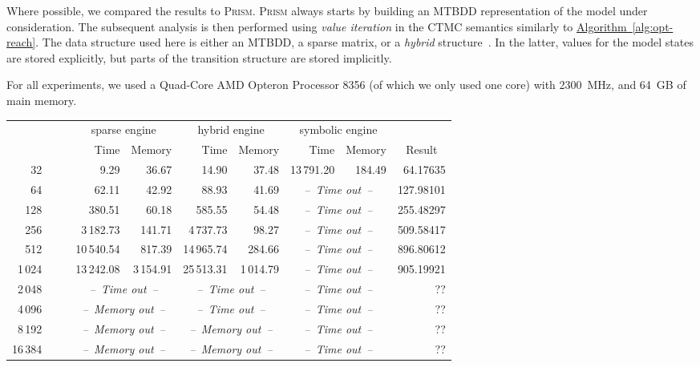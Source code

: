 \documentclass[10pt,twocolumn]{article}
\newcommand{\PRISM}{\textsc{Prism}\xspace}
\newcommand{\timelimit}{\emph{--~Time out~--}}
\newcommand{\memlimit}{\emph{--~Memory out~--}}
\newcommand{\refalg}[1]{\texorpdfstring{\hyperref[alg:#1]{Algorithm~\ref*{alg:#1}}}{Algorithm~\ref*{alg:#1}}}
\begin{document}
Where possible, we compared the results to \PRISM.
\PRISM always starts by building an MTBDD representation of the model under consideration.
The subsequent analysis is then performed using \emph{value iteration} in the CTMC semantics similarly to \refalg{opt-reach}.
The data structure used here is either an MTBDD, a sparse matrix, or a \emph{hybrid} structure~\cite{KwiatkowskaNP04}.
In the latter, values for the model states are stored explicitly, but parts of the transition structure are stored implicitly.

For all experiments, we used a Quad-Core AMD Opteron\texttrademark{} Processor 8356 (of which we only used one core)
with 2300~MHz, and 64~GB of main memory.

  \setlength{\tabcolsep}{0.6mm}
\begin{table*}
  \centering
  \caption{\PRISM results for the number of repairs in the workstation cluster until }
  \label{tab:cluster_detailed_prism}
\begin{tabular}{|rrr|rr|rr|rr|r|}
  \hline
    && & \multicolumn{2}{c|}{sparse engine} & \multicolumn{2}{c|}{hybrid engine} & \multicolumn{2}{c|}{symbolic engine} & \\
   & \multicolumn{1}{c}{} & \multicolumn{1}{c|}{} & Time & Memory & Time & Memory & Time & Memory & \multicolumn{1}{c|}{Result} \\
  \hline
  32 &  &  & 9.29 & 36.67 & 14.90 & 37.48 & 13\,791.20 & 184.49 & 64.17635 \\
  64 &  &  & 62.11 & 42.92 & 88.93 & 41.69 & \multicolumn{2}{c|}{\timelimit} & 127.98101 \\
  128 &  &  & 380.51 & 60.18 & 585.55 & 54.48 & \multicolumn{2}{c|}{\timelimit} & 255.48297 \\
  256 &  &  & 3\,182.73 & 141.71 & 4\,737.73 & 98.27 & \multicolumn{2}{c|}{\timelimit} & 509.58417 \\
  512 &  &  & 10\,540.54 & 817.39 & 14\,965.74 & 284.66 & \multicolumn{2}{c|}{\timelimit} & 896.80612 \\
  1\,024 &  &  & 13\,242.08 & 3\,154.91 & 25\,513.31 & 1\,014.79 & \multicolumn{2}{c|}{\timelimit} & 905.19921 \\
  2\,048 &  &  & \multicolumn{2}{c|}{\timelimit} & \multicolumn{2}{c|}{\timelimit} & \multicolumn{2}{c|}{\timelimit} & ?? \\
  4\,096 &  &  & \multicolumn{2}{c|}{\memlimit} & \multicolumn{2}{c|}{\timelimit} & \multicolumn{2}{c|}{\timelimit} & ?? \\
  8\,192 &  &  & \multicolumn{2}{c|}{\memlimit} & \multicolumn{2}{c|}{\memlimit} & \multicolumn{2}{c|}{\timelimit} & ?? \\
  16\,384 &  &  & \multicolumn{2}{c|}{\memlimit} & \multicolumn{2}{c|}{\memlimit} & \multicolumn{2}{c|}{\timelimit} & ?? \\
  \hline
\end{tabular}
\end{table*}
\end{document}
